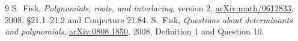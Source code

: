 \documentclass[11pt]{article}
\begin{document}
\begin{thebibliography}{9}
S.~Fisk, \emph{Polynomials, roots, and interlacing}, version 2,
\href{https://arxiv.org/abs/math/0612833}{arXiv:math/0612833},
2008, \S21.1--21.2 and Conjecture 21.84.
S.~Fisk, \emph{Questions about determinants and polynomials},
\href{https://arxiv.org/abs/0808.1850}{arXiv:0808.1850}, 2008,
Definition 1 and Question 10.
\end{thebibliography}
\end{document}
